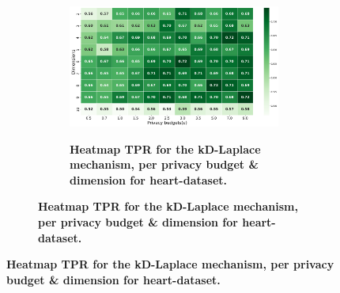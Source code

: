 \newpage
\begin{figure}[H]
    \centering
    \begin{subfigure}[b]{0.9\textwidth}
        \begin{subfigure}[c]{1\textwidth}
            \caption{\textbf{Heatmap TPR for the kD-Laplace mechanism, per privacy budget \& dimension for heart-dataset.}}
            \includegraphics[width=1\textwidth]{Results/kd-laplace/kd-Laplace/heart-dataset/tpr.png}
            \label{fig:privacy_tpr_heart-dataset_adversial_advantage_kd-laplace}
        \end{subfigure}
        \vfill %


\end{subfigure}
\end{figure}
